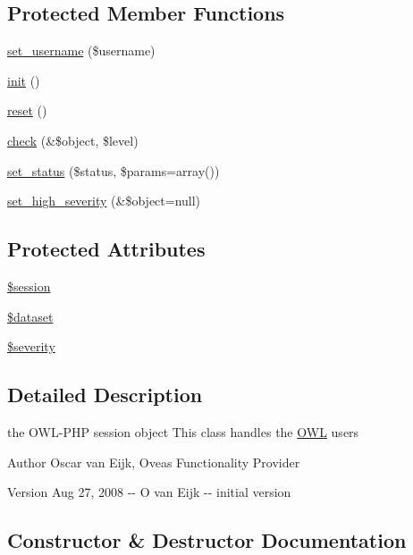 \subsection*{Protected Member Functions}
\begin{DoxyCompactItemize}
\item 
\hyperlink{classUserHandler_afbcc9a275b547cca0bd4cff567b054a0}{set\_\-username} (\$username)
\item 
\hyperlink{class__OWL_ae0ef3ded56e8a6b34b6461e5a721cd3e}{init} ()
\item 
\hyperlink{class__OWL_a2f2a042bcf31965194c03033df0edc9b}{reset} ()
\item 
\hyperlink{class__OWL_ad6f4f6946f40199dd0333cf219fa500e}{check} (\&\$object, \$level)
\item 
\hyperlink{class__OWL_aea912d0ede9b3c2a69b79072d94d4787}{set\_\-status} (\$status, \$params=array())
\item 
\hyperlink{class__OWL_a576829692a3b66e3d518853bf43abae3}{set\_\-high\_\-severity} (\&\$object=null)
\end{DoxyCompactItemize}
\subsection*{Protected Attributes}
\begin{DoxyCompactItemize}
\item 
\hyperlink{classUserHandler_af097b7fd1ee085b46a6c34e071508a7f}{\$session}
\item 
\hyperlink{classUserHandler_ac38c1ea50b2820ed03781bdbe8eb2e08}{\$dataset}
\item 
\hyperlink{class__OWL_ad26b40a9dbbacb33e299b17826f8327c}{\$severity}
\end{DoxyCompactItemize}


\subsection{Detailed Description}
the OWL-\/PHP session object This class handles the \hyperlink{classOWL}{OWL} users \begin{DoxyAuthor}{Author}
Oscar van Eijk, Oveas Functionality Provider 
\end{DoxyAuthor}
\begin{DoxyVersion}{Version}
Aug 27, 2008 -\/-\/ O van Eijk -\/-\/ initial version 
\end{DoxyVersion}


\subsection{Constructor \& Destructor Documentation}
